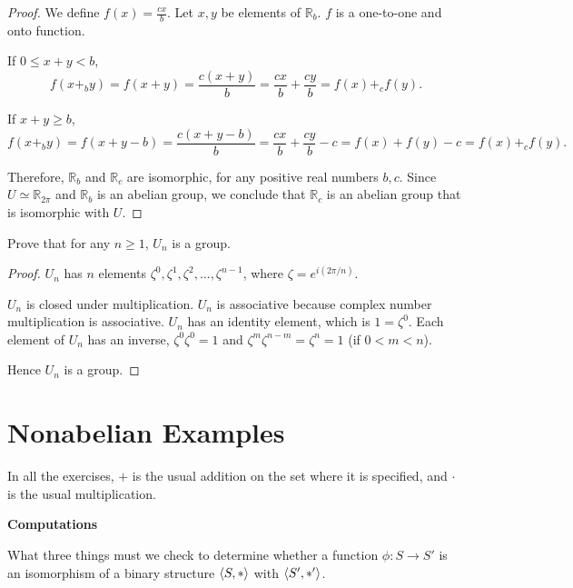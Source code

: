 \begin{proof}
    We define $f(x) = \frac{cx}{b}$. Let $x, y$ be elements of $\mathbb{R}_{b}$. $f$ is a one-to-one and onto function.

    If $0\le x + y < b$,
    \[
        f(x {+}_{b} y) = f(x + y) = \frac{c(x+y)}{b} = \frac{cx}{b} + \frac{cy}{b} = f(x) {+}_{c} f(y).
    \]

    If $x + y \ge b$,
    \[
        f(x {+}_{b} y) = f(x + y - b) = \frac{c(x + y - b)}{b} = \frac{cx}{b} + \frac{cy}{b} - c = f(x) + f(y) - c = f(x) {+}_{c} f(y).
    \]

    Therefore, $\mathbb{R}_{b}$ and $\mathbb{R}_{c}$ are isomorphic, for any positive real numbers $b, c$. Since $U\simeq\mathbb{R}_{2\pi}$ and $\mathbb{R}_{b}$ is an abelian group, we conclude that $\mathbb{R}_{c}$ is an abelian group that is isomorphic with $U$.
\end{proof}

\begin{exercise}
    Prove that for any $n\geq 1$, $U_{n}$ is a group.
\end{exercise}

\begin{proof}
    $U_{n}$ has $n$ elements $\zeta^{0}, \zeta^{1}, \zeta^{2}, \ldots, \zeta^{n-1}$, where $\zeta = e^{i(2\pi/n)}$.

    $U_{n}$ is closed under multiplication. $U_{n}$ is associative because complex number multiplication is associative. $U_{n}$ has an identity element, which is $1 = \zeta^{0}$. Each element of $U_{n}$ has an inverse, $\zeta^{0}\zeta^{0} = 1$ and $\zeta^{m}\zeta^{n-m} = \zeta^{n} = 1$ (if $0 < m < n$).

    Hence $U_{n}$ is a group.
\end{proof}

\section{Nonabelian Examples}
\setcounter{exercise}{0}

In all the exercises, $+$ is the usual addition on the set where it is specified, and $\cdot$ is the usual multiplication.

\textbf{Computations}

\begin{exercise}
    What three things must we check to determine whether a function $\phi: S\to S'$ is an isomorphism of a binary structure $\left\langle{S, *}\right\rangle$ with $\left\langle{S', *'}\right\rangle$.
\end{exercise}

